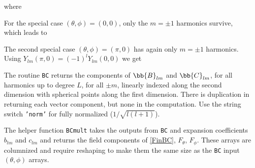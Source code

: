 \noindent where

For the special case $(\theta,\phi) = (0,0)$, only the $m = \pm 1$ harmonics survive, which leads to

The second special case $(\theta,\phi) = (\pi,0)$ has again only $m = \pm 1$ harmonics.  Using $Y_{lm}(\pi,0) = (-1)^l Y_{lm}(0,0)$ we get

The routine \texttt{BC} returns the components of $\bb{B}_{lm}$ and $\bb{C}_{lm}$, for all harmonics up to degree $L$, for all $\pm m$, linearly indexed along the second dimension with spherical points along the first dimension. There is duplication in returning each vector component, but none in the computation.  Use the string switch \texttt{'norm'} for fully normalized ($1/\sqrt{l(l+1)}$). 

The helper function \texttt{BCmult} takes the outputs from \texttt{BC} and expansion coefficients $b_{lm}$ and $c_{lm}$ and returns the field components of \eqref{FinBC}, $F_{\theta}$, $F_{\phi}$. These arrays are columnized and require reshaping to make them the same size as the \texttt{BC} input $(\theta,\phi)$ arrays.

{\footnotesize
{}
}

{\footnotesize
{}
}

\clearpage
\newpage


